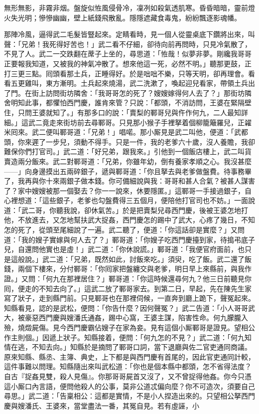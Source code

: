 \begin{myquote}
無形無影，非霧非烟。盤旋似恠風侵骨冷，凜冽如殺氣透肌寒。昏昏暗暗，靈前燈火失光明；慘慘幽幽，壁上紙錢飛散亂。隱隱遮藏食毒鬼，紛紛飄逐影魂幡。
\end{myquote}

那陣冷風，逼得武二毛髮皆豎起來。{}定睛看時，見一個人從靈桌底下鑽將出來，叫聲：「兄弟！我死得好苦也！」武二看不仔細，卻待向前再問時，只見冷氣散了，不見了人。武二一交跌翻在蓆子上坐的，尋思道：「恠哉！似夢非夢。剛纔我哥哥正要報我知道，又被我的神氣冲散了。想來他這一死，必然不明。」聽那更鼓，正打三更三點。囘頭看那土兵，正睡得好。於是咄咄不樂，只等天明，卻再理會。看看五更雞叫，東方漸明。土兵起來燒湯，武二洗漱了，喚起迎兒看家，帶領土兵出了門。在街上訪問街坊隣舍：「我哥哥怎的死了？嫂嫂嫁得何人去了？」那街坊隣舍明知此事，都懼怕西門慶，誰肯來管？只說：「都頭，不消訪問，王婆在緊隔壁住，只問王婆就知了。」有那多口的說：「賣梨的鄆哥兒與仵作何九，二人最知詳細。」這武二竟走來街坊前去尋鄆哥。只見那小猴子手裡拏着個柳籠簸羅兒，正糴米囘來。武二便叫鄆哥道：「兄弟！」唱喏。那小厮見是武二叫他，便道：「武都頭，你來遲了一步兒，須動不得手。只是一件，我的老爹六十歲，沒人養贍，我卻難保你們打官司。」{}武二道：「好兄弟，跟我來。」引他到一個飯店樓上，武二叫貨賣造兩分飯來。武二對鄆哥道：「兄弟，你雖年幼，倒有養家孝順之心。我沒甚麼——」向身邊摸出五兩碎銀子，遞與鄆哥道：「你且拏去與老爹做盤費。待事務畢了，我再與你十來兩銀子做本錢。你可備細說與我：哥哥和甚人合氣？被甚人謀害了？家中嫂嫂被那一個娶去？你一一說來，休要隱匿。」這鄆哥一手接過銀子，自心裡想道：「這些銀子，老爹也勾盤費得三五個月，便陪他打官司也不妨。」一面說道：「武二哥，你聽我說，卻休氣苦。」於是把賣梨兒尋西門慶，後被王婆怎地打他，不放進去，又怎地幫扶武大捉姦，西門慶怎的踢中了武大，心疼了幾日，不知怎的死了，從頭至尾細說了一遍。武二聽了，便道：「你這話卻是實麼？」又問道：「我的嫂子實嫁與何人去了？」鄆哥道：「你嫂子吃西門慶擡到家，待搗弔底子兒，自還問他實也是虛！」武二道：「你休說謊。」鄆哥道：「我便官府面前，也只是這般說。」{}武二道：「兄弟，既然如此，討飯來吃。」須臾，吃了飯。武二還了飯錢，兩個下樓來，分付鄆哥：「你囘家把盤纏交與老爹，明日早上來縣前，與我作證。」又問：「何九在那裡居住？」鄆哥道：「你這時候還尋何九？他三日前聽見你囘，便走的不知去向了。」{}這武二放了鄆哥家去。到第二日，早起，先在陳先生家寫了狀子，走到縣門前。只見鄆哥也在那裡伺候，一直奔到廳上跪下，聲冤起來。知縣看見，認的是武松，便問：「你告什麼？因何聲冤？」武二告道：「小人哥哥武大，被豪惡西門慶與嫂潘氏通姦，踢中心窩，王婆主謀，陷害性命。何九朦朧入殮，燒燬屍傷。見今西門慶霸佔嫂子在家為妾。見有這個小厮鄆哥是證見。望相公作主則個。」因遞上狀子。知縣接着，便問：「何九怎的不見？」武二道：「何九知情在逃，不知去向。」知縣於是摘問了鄆哥口詞，當下退廳與佐二官吏通同商議。原來知縣、縣丞、主簿、典史，上下都是與西門慶有首尾的，因此官吏通同計較，這件事難以問理。知縣隨出來叫武松道：「你也是個本縣中都頭，怎不省得法度？自古『捉姦見雙，殺人見傷』。你那哥哥屍首又沒了，又不曾捉得他姦。你今只憑這小厮口內言語，便問他殺人的公事，莫非公道忒偏向麼？你不可造次，須要自己尋思。」武二道：「告稟相公：這都是實情，不是小人捏造出來的。只望相公拏西門慶與嫂潘氏、王婆來，當堂盡法一番，其冤自見。若有虛誣，小